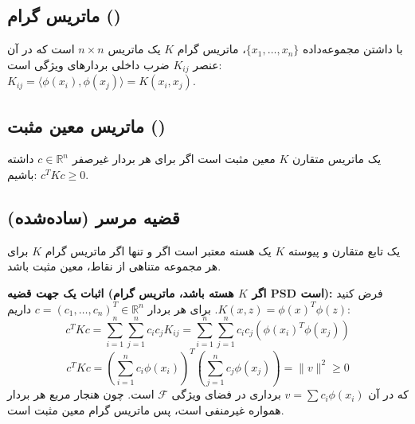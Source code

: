 \documentclass{article}
\begin{document}
\subsection*{ماتریس گرام ()}
با داشتن مجموعه‌داده $\{x_1, \dots, x_n\}$، ماتریس گرام $K$ یک ماتریس $n \times n$ است که در آن عنصر $K_{ij}$ ضرب داخلی بردارهای ویژگی است: $K_{ij} = \langle \phi(x_i), \phi(x_j) \rangle = K(x_i, x_j)$.

\subsection*{ماتریس معین مثبت ()}
یک ماتریس متقارن $K$ معین مثبت است اگر برای هر بردار غیرصفر $c \in \mathbb{R}^n$ داشته باشیم: $c^T K c \ge 0$.

\subsection*{قضیه مرسر (ساده‌شده)}
یک تابع متقارن و پیوسته $K$ یک هسته معتبر است اگر و تنها اگر ماتریس گرام $K$ برای هر مجموعه متناهی از نقاط، معین مثبت باشد.

\textbf{اثبات یک جهت قضیه (اگر $K$ هسته باشد، ماتریس گرام PSD است):}
فرض کنید $K(x, z) = \phi(x)^T \phi(z)$. برای هر بردار $c = (c_1, \dots, c_n)^T \in \mathbb{R}^n$ داریم:
\[
c^T K c = \sum_{i=1}^n \sum_{j=1}^n c_i c_j K_{ij} = \sum_{i=1}^n \sum_{j=1}^n c_i c_j (\phi(x_i)^T \phi(x_j))
\]
\[
c^T K c = \left( \sum_{i=1}^n c_i \phi(x_i) \right)^T \left( \sum_{j=1}^n c_j \phi(x_j) \right) = \|v\|^2 \ge 0
\]
که در آن $v = \sum c_i \phi(x_i)$ برداری در فضای ویژگی $\mathcal{F}$ است. چون هنجار مربع هر بردار همواره غیرمنفی است، پس ماتریس گرام معین مثبت است.
\end{document}
